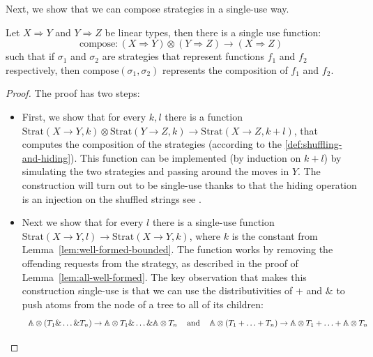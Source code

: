 \documentclass[10pt,a4paper]{amsart}
\numberwithin{equation}{section}
\theoremstyle{plain}
\newcommand{\atoms}{\mathbb A}
\newcommand{\Strat}{\text{Strat}}
\begin{document}
Next, we show that we can compose strategies in a single-use way. 
\begin{lemma}\label{lem:compose-single-use-linear-type}
    Let $X \Rightarrow Y$ and $Y \Rightarrow Z$ be linear types, then there is a single use function:
    \[\text{compose} : (X \Rightarrow Y) \otimes (Y \Rightarrow Z) \to (X \Rightarrow Z)\]
    such that if $\sigma_1$ and $\sigma_2$ are strategies that represent functions $f_1$ and $f_2$ respectively,
    then $\text{compose}(\sigma_1, \sigma_2)$ represents the composition of $f_1$ and $f_2$.
\end{lemma}
\begin{proof}
    The proof has two steps:
    \begin{itemize}
        \item First, we show that for every $k, l$ there is a function
              $\Strat(X \to Y, k) \otimes \Strat(Y \to Z, k) \to \Strat(X \to Z, k + l)$, 
              that computes the composition of the strategies (according to the \ref{def:shuffling-and-hiding}). 
              This function can be implemented (by induction on $k + l$) by simulating the two strategies 
              and passing around the moves in $Y$. The construction will turn out to be single-use 
              thanks to that the hiding operation is an injection on 
              the shuffled strings see \cite[Covering Lemma]{abramsky2013semantics}.
        \item Next we show that for every $l$ there is a single-use function 
              $\Strat(X \to Y, l) \to \Strat(X \to Y, k)$, where $k$ is the 
              constant from Lemma~\ref{lem:well-formed-bounded}.
              The function works by removing the offending requests from the 
              strategy, as described in the proof of Lemma~\ref{lem:all-well-formed}. The key observation that makes this construction single-use is that we can use the 
              distributivities of $+$ and $\&$ to push atoms from the node 
              of a tree to all of its children:
              \[
                \begin{tabular}{ccc}
                    $ \atoms \otimes (T_1 \& \ldots \& T_n) \to \atoms \otimes T_1 \& \ldots \& \atoms \otimes T_n$ & and &
                    $ \atoms \otimes (T_1 +  \ldots + T_n) \to \atoms \otimes T_1 + \ldots + \atoms \otimes T_n$
                \end{tabular}
              \]
    \end{itemize}
\end{proof}
\end{document}
